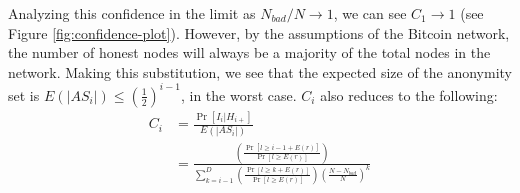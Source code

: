 Analyzing this confidence in the limit as $N_{bad}/N \to 1$, we can see $C_1 \to 1$ (see Figure \ref{fig:confidence-plot}). However, by the assumptions of the Bitcoin network, the number of honest nodes will always be a majority of the total nodes in the network. Making this substitution, we see that the expected size of the anonymity set is $E(|AS_i|) \leq \left(\frac{1}{2}\right)^{i-1}$, in the worst case. $C_i$ also reduces to the following:
\begin{align*}
C_i & = \frac{\Pr[I_i | H_{i+}]}{E(|AS_i|)} \\
& = \frac{\left( \frac{ \Pr[l \geq i - 1 + E(r)] } { \Pr[l \geq E(r)] }\right)}{\sum_{k=i-1}^{D} \left( \frac{ \Pr[l \geq k + E(r)] } { \Pr[l \geq E(r)] }\right) \left(\frac{N - N_{bad}}{N}\right)^{k}}
\end{align*}




